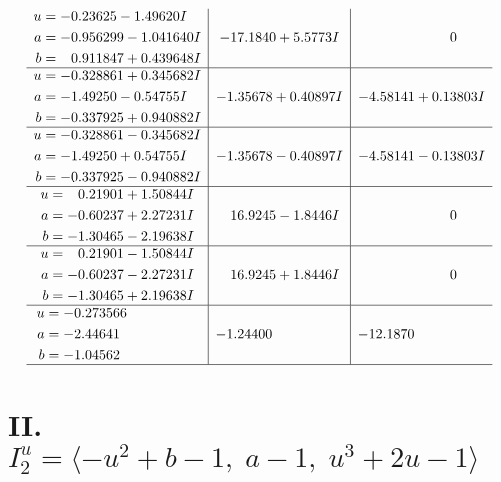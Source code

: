 \documentclass[1p]{elsarticle_modified}
\theoremstyle{definition}
\begin{document}
$$\begin{array}{c|c|c}
\begin{aligned}
u &= -0.23625 - 1.49620 I \\
a &= -0.956299 - 1.041640 I \\
b &= \phantom{-}0.911847 + 0.439648 I\end{aligned}
 & -17.1840 + 5.5773 I & \phantom{-0.000000 } 0 \\ \hline\begin{aligned}
u &= -0.328861 + 0.345682 I \\
a &= -1.49250 - 0.54755 I \\
b &= -0.337925 + 0.940882 I\end{aligned}
 & -1.35678 + 0.40897 I & -4.58141 + 0.13803 I \\ \hline\begin{aligned}
u &= -0.328861 - 0.345682 I \\
a &= -1.49250 + 0.54755 I \\
b &= -0.337925 - 0.940882 I\end{aligned}
 & -1.35678 - 0.40897 I & -4.58141 - 0.13803 I \\ \hline\begin{aligned}
u &= \phantom{-}0.21901 + 1.50844 I \\
a &= -0.60237 + 2.27231 I \\
b &= -1.30465 - 2.19638 I\end{aligned}
 & \phantom{-}16.9245 - 1.8446 I & \phantom{-0.000000 } 0 \\ \hline\begin{aligned}
u &= \phantom{-}0.21901 - 1.50844 I \\
a &= -0.60237 - 2.27231 I \\
b &= -1.30465 + 2.19638 I\end{aligned}
 & \phantom{-}16.9245 + 1.8446 I & \phantom{-0.000000 } 0 \\ \hline\begin{aligned}
u &= -0.273566\phantom{ +0.000000I} \\
a &= -2.44641\phantom{ +0.000000I} \\
b &= -1.04562\phantom{ +0.000000I}\end{aligned}
 & -1.24400\phantom{ +0.000000I} & -12.1870\phantom{ +0.000000I}\\
 \hline 
 \end{array}$$\newpage\newpage\renewcommand{\arraystretch}{1}
\centering \section*{II. $I^u_{2}= \langle - u^2+b-1,\;a-1,\;u^3+2 u-1 \rangle$}
\end{document}
